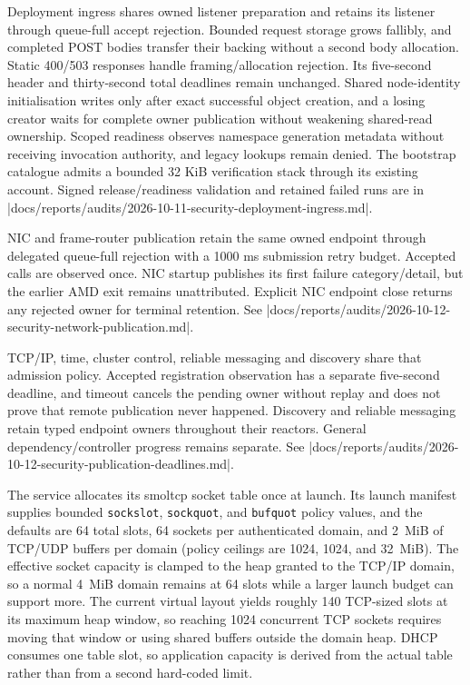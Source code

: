 Deployment ingress shares owned listener preparation and retains its listener
through queue-full accept rejection. Bounded request storage grows fallibly, and
completed POST bodies transfer their backing without a second body allocation.
Static 400/503 responses handle framing/allocation rejection. Its five-second
header and thirty-second total deadlines remain unchanged. Shared node-identity
initialisation writes only after exact successful object creation, and a losing
creator waits for complete owner publication without weakening shared-read
ownership. Scoped readiness observes namespace generation metadata without
receiving invocation authority, and legacy lookups remain denied. The bootstrap
catalogue admits a bounded 32 KiB verification stack through its existing
account. Signed release/readiness validation and retained failed runs are in
\repofile|docs/reports/audits/2026-10-11-security-deployment-ingress.md|.

NIC and frame-router publication retain the same owned endpoint through
delegated queue-full rejection with a 1000 ms submission retry budget. Accepted
calls are observed once. NIC startup publishes its first failure category/detail, but
the earlier AMD exit remains unattributed. Explicit NIC endpoint close returns
any rejected owner for terminal retention. See
\repofile|docs/reports/audits/2026-10-12-security-network-publication.md|.

TCP/IP, time, cluster control, reliable messaging and discovery share that
admission policy. Accepted registration observation has a separate five-second
deadline, and timeout cancels the pending owner without replay and does not prove
that remote publication never happened. Discovery and reliable messaging retain
typed endpoint owners throughout their reactors. General dependency/controller
progress remains separate. See
\repofile|docs/reports/audits/2026-10-12-security-publication-deadlines.md|.

The service allocates its smoltcp socket table once at launch. Its launch
manifest supplies bounded \texttt{sockslot}, \texttt{sockquot}, and
\texttt{bufquot} policy values, and the defaults are 64 total slots, 64 sockets per
authenticated domain, and 2~MiB of TCP/UDP buffers per domain (policy
ceilings are 1024, 1024, and 32~MiB). The effective socket capacity is clamped
to the heap granted to the TCP/IP domain, so a normal 4~MiB domain remains at
64 slots while a larger launch budget can support more. The current virtual
layout yields roughly 140 TCP-sized slots at its maximum heap window, so reaching
1024 concurrent TCP sockets requires moving that window or using shared
buffers outside the domain heap. DHCP consumes
one table slot, so application capacity is derived from the actual table rather
than from a second hard-coded limit.


